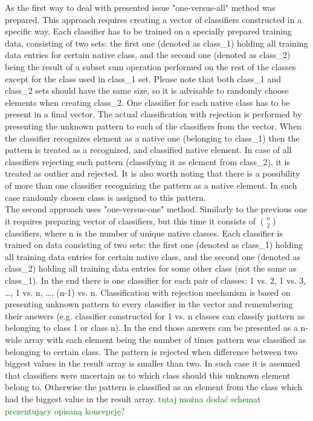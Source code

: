 \documentclass{llncs}
\begin{document}
As the first way to deal with presented issue "one-versus-all" method was prepared. This approach requires creating a vector of classifiers constructed in a specific way. Each classifier has to be trained on a specially prepared training data, consisting of two sets: the first one (denoted as class\_1) holding all training data entries for certain native class, and the second one (denoted as class\_2) being the result of a subset sum operation performed on the rest of the classes except for the class used in class\_1 set. Please note that both class\_1 and class\_2 sets should have the same size, so it is advisable to randomly choose elements when creating class\_2. One classifier for each native class has to be present in a final vector. The actual classification with rejection is performed by presenting the unknown pattern to each of the classifiers from the vector. When the classifier recognizes element as a native one (belonging to class\_1) then the pattern is treated as a recognized, and classified native element. In case of all classifiers rejecting such pattern (classifying it as element from class\_2), it is treated as outlier and rejected. It is also worth noting that there is a possibility of more than one classifier recognizing the pattern as a native element. In such case randomly chosen class is assigned to this pattern. \\

The second approach uses "one-versus-one" method. Similarly to the previous one it requires preparing vector of classifiers, but this time it consists of ${n}\choose{2}$ classifiers, where n is the number of unique native classes. Each classifier is trained on data consisting of two sets: the first one (denoted as class\_1) holding all training data entries for certain native class, and the second one (denoted as class\_2) holding all training data entries for some other class (not the same as class\_1). In the end there is one classifier for each pair of classes: 1 vs. 2, 1 vs. 3, \dots, 1 vs. n, \dots, (n-1) vs. n. Classification with rejection mechanism is based on presenting unknown pattern to every classifier in the vector and remembering their answers (e.g. classifier constructed for 1 vs. n classes can classify pattern as belonging to class 1 or class n). In the end those answers can be presented as a n-wide array with each element being the number of times pattern was classified as belonging to certain class. The pattern is rejected when difference between two biggest values in the result array is smaller than two. In such case it is assumed that classifiers were uncertain as to which class should this unknown element belong to. Otherwise the pattern is classified as an element from the class which had the biggest value in the result array. \textcolor{green}{tutaj można dodać schemat prezentujący opisaną koncepcję?} \\
\end{document}
